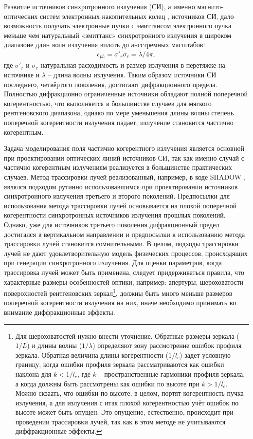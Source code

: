 Развитие источников синхротронного излучения (СИ), а именно магнито-оптических систем электронных накопительных колец \cite{bartolini_challenges_2021}, \cite{hettel_challenges_2014} источников СИ, дало возможность получать электронные пучки с эмиттансом электронного пучка меньше чем натуральный «эмиттанс» синхротронного излучения в широком диапазоне длин волн излучения вплоть до ангстремных масштабов:
\begin{align}
	\epsilon_{ph} = \sigma'_{r}\sigma_{r} = \lambda/4\pi,
\end{align}
где $\sigma'_{r}$ и $\sigma_{r}$ натуральная расходимость и размер излучения в перетяжке на источнике и $\lambda$ -- длина волны излучения. Таким образом источники СИ последнего, четвёртого поколения, достигают дифракционного предела. Полностью дифракционно ограниченные источники обладают полной поперечной когерентностью, что выполняется в большинстве случаев для мягкого рентгеновского диапазона, однако по мере уменьшения длины волны степень поперечной когерентности излучения падает, излучение становится частично когерентным. 

Задача моделирования поля частично когерентного излучения является основной при проектировании оптических линий источников СИ, так как именно случай с частично когерентным излучениям реализуется в большинстве практических случаев. Метод трассировки лучей реализованный, например, в коде SHADOW \cite{sanchez_del_rio_shadow3_2011}, являлся подходом рутинно использовавшимся при проектировании источников синхротронного излучения третьего и второго поколений. Предпосылки для использования метода трассировки лучей основывается на плохой поперечной когерентности синхротронных источников излучения прошлых поколений. Однако, уже для источников третьего поколения дифракционный предел достигался в вертикальном направлении и предпосылки к использованию метода трассировки лучей становится сомнительными. В целом, подходы трассировки лучей не дают удовлетворительную модель физических процессов, происходящих при генерации синхротронного излучения. Для оценки параметров, когда трассировка лучей может быть применена, следует придерживаться правила, что характерные размеры особенностей оптики, например: апертуры, шероховатости поверохностей рентгеновских зеркал\footnote{Для шероховатостей нужно внести уточнение. Обратные размеры  зеркала ($1/L$) и длины волны ($1/\lambda$) определяют зону рассмотрение ошибок профиля зеркала. Обратная величина длины когерентности ($1/l_c$) задет условную границу, когда ошибки профиля зеркала рассматриваются как ошибки наклона для $k < 1/l_c$, где $k$ -- пространственные гармоники профиля зеркала, а когда должны быть рассмотрены как ошибки по высоте при $k > 1/l_c$. Можно скзаать, что ошибки по высоте, в целом, портят когерентность пучка излучения, а для излучения с итак плохой когерентностью учёт ошибок по высоте может быть опущен. Это опущение, естественно, происходит при проведении трассировки лучей, так как в этом методе не учитываются диффракционные эффекты.}, должны быть много меньше размеров поперечной когерентности излучения на них, иначе необходимо принимать во внимание диффракционные эффекты.

